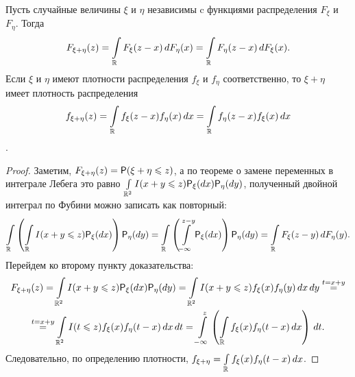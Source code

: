 \begin{lemma}[о свертке]
	Пусть случайные величины $\xi$ и $\eta$ независимы c функциями распределения $F_\xi$ и $F_\eta$. Тогда
	$$ F_{\xi + \eta} (z) = \int\limits_\R F_\xi (z - x) \, dF_\eta (x) = \int\limits_\R F_\eta(z - x) \, d F_\xi(x).$$
	Если $\xi$ и $\eta$ имеют плотности распределения $f_\xi$ и $f_\eta$ соответственно, то $\xi + \eta$ имеет плотность распределения 
	$$f_{\xi + \eta} (z) = \int\limits_\R f_\xi (z - x) f_\eta (x) \, dx = \int\limits_\R f_\eta (z - x) f_\xi(x) \, dx$$.
	\begin{proof}
		Заметим, $F_{\xi + \eta} (z) = \P ( \xi + \eta \leqslant z)$, а по теореме о замене переменных в интеграле Лебега это равно $\int\limits_{\R^2} I(x + y \leqslant z) \P_\xi(dx) \P_\eta(dy)$, полученный двойной интеграл по Фубини можно записать как повторный:
		$$ \int\limits_\R \left( \int\limits_\R I(x + y \leqslant z) \P_\xi(dx) \right) \P_\eta(dy) = \int\limits_\R \left( \int\limits_{-\infty}^{z-y} \P_\xi(dx) \right) \P_\eta(dy) = \int\limits_\R F_\xi(z - y) \, dF_\eta(y).$$
		Перейдем ко второму пункту доказательства:
		\begin{multline*}
			F_{\xi + \eta} (z) = \int\limits_{\R^2} I(x + y \leqslant z) \P_\xi(dx) \P_\eta(dy) = \int\limits_{\R^2} I(x + y \leqslant z) f_\xi(x) f_\eta(y) \, dx\,dy \overset{t = x+y}{=} \\ \overset{t = x+y}{=} \int\limits_{\R^2} I(t \leqslant z) f_\xi(x) f_\eta(t - x) \, dx\,dt = \int\limits_{-\infty}^z \left( \int\limits_\R f_\xi(x) f_\eta(t-x) \, dx \right) \, dt.
		\end{multline*}
		Следовательно, по определению плотности, $f_{\xi+\eta} = \int\limits_\R f_\xi(x) f_\eta(t-x) \, dx$.
	\end{proof}
\end{lemma}